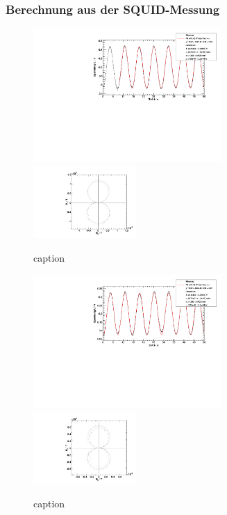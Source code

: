 \subsubsection{Berechnung aus der SQUID-Messung}
\begin{figure}[H]
\begin{center}
  \includegraphics[width=0.64\textwidth]{../img/fit_Spule_R1.pdf}
  \includegraphics[width=0.35\textwidth]{../img/polar_Spule_R1.pdf}
  \caption{caption}
  \label{img:R1}
\end{center}
\end{figure}

\begin{figure}[H]
\begin{center}
  \includegraphics[width=0.64\textwidth]{../img/fit_Spule_R2.pdf}
  \includegraphics[width=0.35\textwidth]{../img/polar_Spule_R2.pdf}
  \caption{caption}
  \label{img:R2}
\end{center}
\end{figure}

